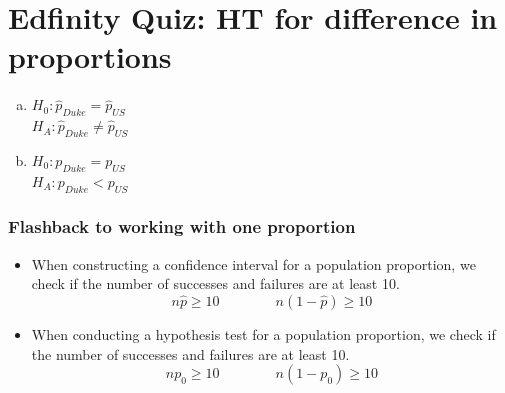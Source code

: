 \documentclass[slidestop,compress,mathserif]{beamer}
\newcommand{\soln}[1]{\textit{#1}}
\begin{document}
\section{Edfinity Quiz: HT for difference in proportions}

\begin{frame}


\begin{enumerate}[(a)]
\item $H_0:  \hat{p}_{Duke} = \hat{p}_{US}$ \\
$H_A:  \hat{p}_{Duke} \ne \hat{p}_{US}$
\item $H_0:  p_{Duke} = p_{US}$ \\
$H_A:  p_{Duke} < p_{US}$
\end{enumerate}

\soln{
}

\end{frame}


\begin{frame}
\frametitle{Flashback to working with one proportion}

\begin{itemize}

\item When constructing a confidence interval for a population proportion, we check if the  number of successes and failures are at least 10.
\[ n\hat{p} \ge 10 \qquad \qquad n(1-\hat{p}) \ge 10 \]

\pause

\item When conducting a hypothesis test for a population proportion, we check if the  number of successes and failures are at least 10.
\[ np_0 \ge 10 \qquad \qquad n(1-p_0) \ge 10 \]

\end{itemize}

\end{frame}
\end{document}
